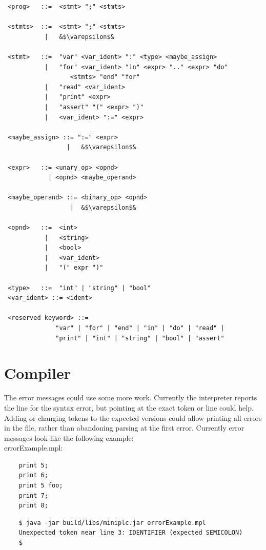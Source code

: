 \documentclass{article}
\begin{document}
\begin{verbatim}
 <prog>   ::=  <stmt> ";" <stmts>

 <stmts>  ::=  <stmt> ";" <stmts>
           |   &$\varepsilon$&

 <stmt>   ::=  "var" <var_ident> ":" <type> <maybe_assign>
           |   "for" <var_ident> "in" <expr> ".." <expr> "do"
                  <stmts> "end" "for"
           |   "read" <var_ident>
           |   "print" <expr>
           |   "assert" "(" <expr> ")"
           |   <var_ident> ":=" <expr>

 <maybe_assign> ::= ":=" <expr>
                 |   &$\varepsilon$&

 <expr>   ::= <unary_op> <opnd>
            | <opnd> <maybe_operand>

 <maybe_operand> ::= <binary_op> <opnd>
                  |  &$\varepsilon$&

 <opnd>   ::=  <int>
           |   <string>
           |   <bool>
           |   <var_ident>
           |   "(" expr ")"

 <type>   ::=  "int" | "string" | "bool"
 <var_ident> ::= <ident>

 <reserved keyword> ::=
              "var" | "for" | "end" | "in" | "do" | "read" |
              "print" | "int" | "string" | "bool" | "assert"
\end{verbatim}

\newpage
\section{Compiler}
The error messages could use some more work. Currently the interpreter reports
the line for the syntax error, but pointing at the exact token or line could
help. Adding or changing tokens to the expected versions could allow printing
all errors in the file, rather than abandoning parsing at the first error.
Currently error messages look like the following example: \\
errorExample.mpl:
\begin{verbatim}
    print 5;
    print 6;
    print 5 foo;
    print 7;
    print 8;
\end{verbatim}
\begin{verbatim}
    $ java -jar build/libs/miniplc.jar errorExample.mpl
    Unexpected token near line 3: IDENTIFIER (expected SEMICOLON)
    $
\end{verbatim}
\end{document}
